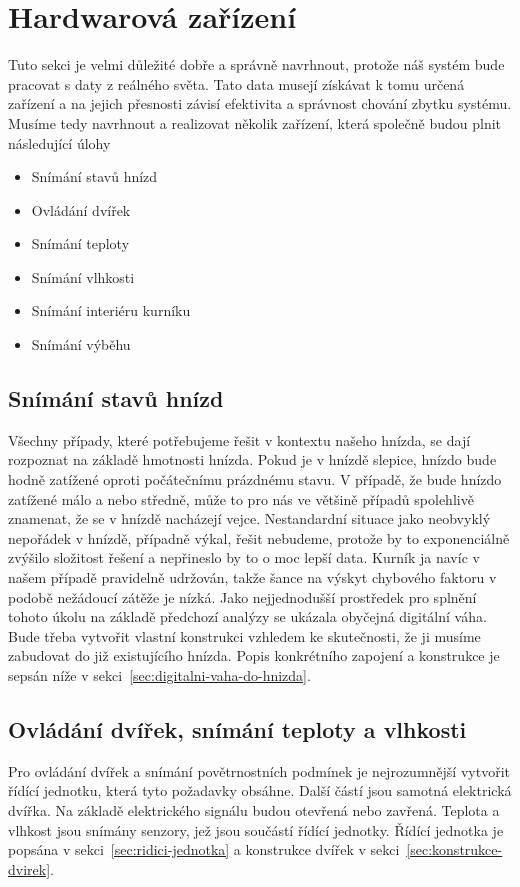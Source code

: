 \section{Hardwarová zařízení}\label{sec:hardwarova-zarizeni}
Tuto sekci je velmi důležité dobře a správně navrhnout, protože náš systém bude pracovat s daty z reálného světa.
Tato data musejí získávat k tomu určená zařízení a na jejich přesnosti závisí efektivita a správnost chování zbytku systému.
Musíme tedy navrhnout a realizovat několik zařízení, která společně budou plnit následující úlohy
\begin{itemize}
    \item Snímání stavů hnízd
    \item Ovládání dvířek
    \item Snímání teploty
    \item Snímání vlhkosti
    \item Snímání interiéru kurníku
    \item Snímání výběhu
\end{itemize}

\subsection{Snímání stavů hnízd}
Všechny případy, které potřebujeme řešit v kontextu našeho hnízda, se dají rozpoznat na základě hmotnosti hnízda.
Pokud je v hnízdě slepice, hnízdo bude hodně zatížené oproti počátečnímu prázdnému stavu.
V případě, že bude hnízdo zatížené málo a nebo středně, může to pro nás ve většině případů spolehlivě znamenat, že se v hnízdě nacházejí vejce.
Nestandardní situace jako neobvyklý nepořádek v hnízdě, případně výkal, řešit nebudeme, protože by to exponenciálně zvýšilo složitost řešení a nepřineslo by to o moc lepší data.
Kurník ja navíc v našem případě pravidelně udržován, takže šance na výskyt chybového faktoru v podobě nežádoucí zátěže je nízká.
Jako nejjednodušší prostředek pro splnění tohoto úkolu na základě předchozí analýzy se ukázala obyčejná digitální váha.
Bude třeba vytvořit vlastní konstrukci vzhledem ke skutečnosti, že ji musíme zabudovat do již existujícího hnízda.
Popis konkrétního zapojení a konstrukce je sepsán níže v sekci~\ref{sec:digitalni-vaha-do-hnizda}.

\subsection{Ovládání dvířek, snímání teploty a vlhkosti}
Pro ovládání dvířek a snímání povětrnostních podmínek je nejrozumnější vytvořit řídící jednotku, která tyto požadavky obsáhne.
Další částí jsou samotná elektrická dvířka. Na základě elektrického signálu budou otevřená nebo zavřená.
Teplota a vlhkost jsou snímány senzory, jež jsou součástí řídící jednotky.
Řídící jednotka je popsána v sekci~\ref{sec:ridici-jednotka} a konstrukce dvířek v sekci~\ref{sec:konstrukce-dvirek}.

